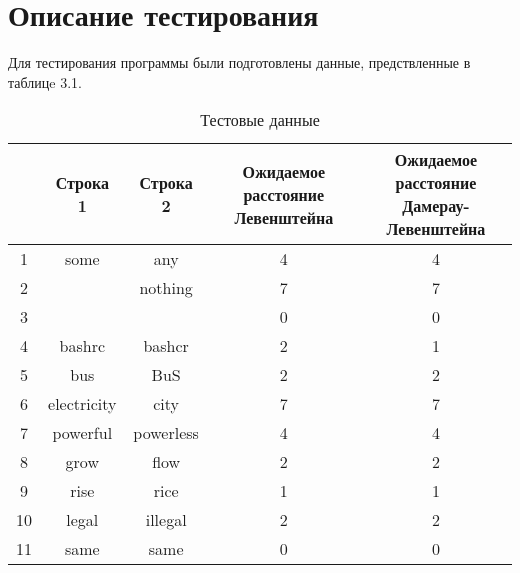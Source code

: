 \section{Описание тестирования}
Для тестирования программы были подготовлены данные, предствленные в таблицe 3.1.

\begin{table}[H]
    \caption{Тестовые данные}
	\begin{tabular}{|c|c|c|c|c|}
 	\hline
    \No{} & Строка 1 & Строка 2 & \makecell{Ожидаемое расстояние\\Левенштейна} & \makecell{Ожидаемое расстояние\\Дамерау-Левенштейна} \\
 	\hline
 	1 & some & any & 4 & 4\\
 	\hline
 	2 & & nothing & 7 & 7\\
 	\hline
 	3 & & & 0 & 0\\
 	\hline
 	4 & bashrc & bashcr & 2 & 1\\
 	\hline
 	5 & bus & BuS & 2 & 2\\
 	\hline
 	6 & electricity & city & 7 & 7\\
 	\hline
 	7 & powerful & powerless & 4 & 4\\
 	\hline
 	8 & grow & flow & 2 & 2\\
 	\hline
 	9 & rise & rice & 1 & 1\\
 	\hline
    10 & legal & illegal & 2 & 2\\
 	\hline
    11 & same & same & 0 & 0\\
    \hline
	\end{tabular}
\end{table}

